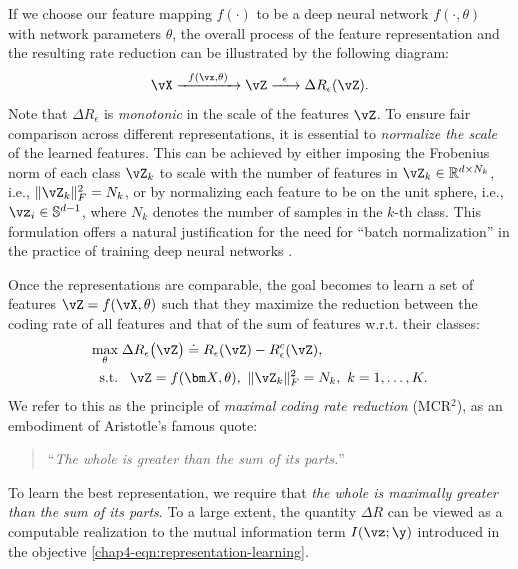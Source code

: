 \documentclass[../../book-main.tex]{subfiles}
\begin{document}
If we choose our feature mapping $f(\cdot)$ to be a deep neural
network $f(\cdot,\theta)$ with network parameters $\theta$, the
overall process of the feature representation and the resulting rate
reduction  can be illustrated by the following diagram:
\begin{equation}
    \vX
    \xrightarrow{\hspace{2mm} f(\vx, \theta)\hspace{2mm}} \vZ
    \xrightarrow{\hspace{2mm} \epsilon \hspace{2mm}} \Delta
    R_{\epsilon}(\vZ).
    \label{chap4-eqn:flow}
\end{equation}
Note that $\Delta R_{\epsilon}$ is {\em monotonic} in the scale of
the features $\vZ$. To ensure fair comparison across different
representations, it is essential to {\em normalize the scale} of the
learned features. This can be achieved by either imposing the
Frobenius norm of each class $\vZ_k$ to scale with the number of
features in $\vZ_k \in \mathbb R^{d \times N_k}$, i.e., $\|\vZ_k\|_F^2
= N_k$, or by normalizing each feature to be on the unit sphere,
i.e., $\vz_i \in \mathbb{S}^{d-1}$, where $N_k$
denotes the number of samples in the $k$-th class. This formulation
offers a natural justification for the need for ``batch
normalization'' in the practice of
training deep neural networks \cite{ioffe2015batch}. %

Once the representations are comparable, the goal becomes to learn a
set of features $\vZ  = f(\vX, \theta)$  such that they maximize the
reduction between the coding rate of all features and that of the sum
of features w.r.t. their classes:
\begin{equation}
    \begin{aligned}
        \max_{\theta } & \;  \Delta R_{\epsilon}\big(\vZ \big) \doteq
        R_{\epsilon}(\vZ) - R_{\epsilon}^c(\vZ ), \\
        \mbox{s.t.} & \ \ \, \vZ = f(\bm X, \theta),\  \|\vZ_k\|_F^2
        = N_k,\ k=1,\dots,K.
    \end{aligned}
    \label{eqn:maximal-rate-reduction}
\end{equation}
We refer to this as the principle of {\em maximal coding rate
reduction} (MCR$^2$), as an embodiment of Aristotle's famous quote:
\begin{quote}
    \centering
    ``{\em The whole is greater than the sum of its parts.}''
\end{quote}
To learn the best representation, we require that {\em the whole is
maximally greater than the sum of its parts}. To a large extent, the
quantity $\Delta R$ can be viewed as a computable realization to the
mutual information term $I(\vz; \y)$ introduced in the objective
\eqref{chap4-eqn:representation-learning}.
\end{document}
